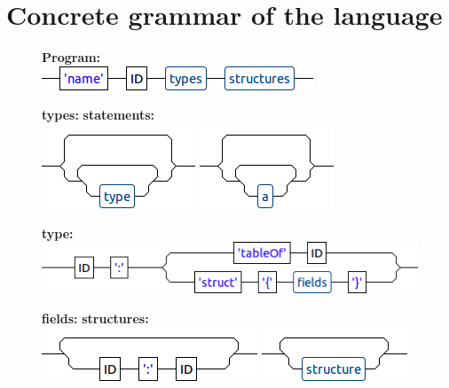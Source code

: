 \chapter{Concrete grammar of the language} \label{anx:grammar}

\begin{figure}[!ht]

\textbf{Program:}\\
\vspace{0.2cm}
\hspace{1cm}\includegraphics[scale=0.37]{./annex/images/p.png}

\textbf{types:} \hspace{6cm}\textbf{statements:}\\
\vspace{0.2cm}
\hspace{1cm}\includegraphics[scale=0.37]{./annex/images/types.png} \hspace{4cm}\hspace{1cm}\includegraphics[scale=0.37]{./annex/images/statements.png}

\textbf{type:}\\
\vspace{0.2cm}
\hspace{1cm}\includegraphics[scale=0.37]{./annex/images/type.png}

\textbf{fields:} \hspace{6cm} \textbf{structures:}\\
\vspace{0.2cm}
\hspace{1cm}\includegraphics[scale=0.37]{./annex/images/fields.png} \hspace{4cm}\includegraphics[scale=0.37]{./annex/images/structures.png}


\end{figure}
